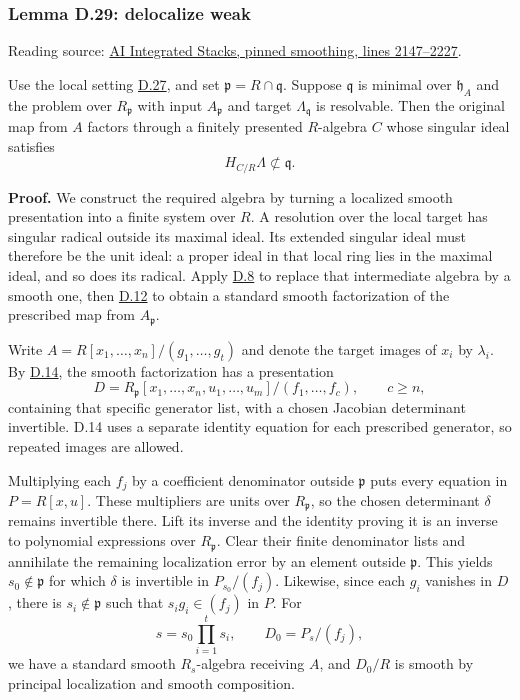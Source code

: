 \documentclass[11pt,a4paper,openany]{report}
\begin{document}
\label{AG-RG-S05-smoothing-lemma-delocalize-weak}

\subsubsection{Lemma D.29: delocalize weak}\label{AG-RG-S05-lemma-d.29-delocalize-weak}

Reading source: \href{https://github.com/KokunoYumeto/unofficial-stacks-project-ai-drafts/blob/565b10e987aba5969b21145a0833f42d69f96790/smoothing.tex\#L2147-L2227}{AI Integrated Stacks, pinned smoothing, lines 2147--2227}.

Use the local setting \hyperref[AG-RG-S05-smoothing-situation-local]{D.27}, and set \(\mathfrak p=R\cap\mathfrak q\). Suppose \(\mathfrak q\) is minimal over \(\mathfrak h_A\) and the problem over \(R_{\mathfrak p}\) with input \(A_{\mathfrak p}\) and target \(\Lambda_{\mathfrak q}\) is resolvable. Then the original map from \(A\) factors through a finitely presented \(R\)-algebra \(C\) whose singular ideal satisfies \[H_{C/R}\Lambda\not\subset\mathfrak q.\]

\textbf{Proof.} We construct the required algebra by turning a localized smooth presentation into a finite system over \(R\). A resolution over the local target has singular radical outside its maximal ideal. Its extended singular ideal must therefore be the unit ideal: a proper ideal in that local ring lies in the maximal ideal, and so does its radical. Apply \hyperref[AG-RG-S05-smoothing-lemma-final-solve]{D.8} to replace that intermediate algebra by a smooth one, then \hyperref[AG-RG-S05-smoothing-lemma-smooth-standard-smooth]{D.12} to obtain a standard smooth factorization of the prescribed map from \(A_{\mathfrak p}\).

Write \(A=R[x_1,\ldots,x_n]/(g_1,\ldots,g_t)\) and denote the target images of \(x_i\) by \(\lambda_i\). By \hyperref[AG-RG-S05-smoothing-lemma-standard-smooth-include-generators]{D.14}, the smooth factorization has a presentation \[D=R_{\mathfrak p}[x_1,\ldots,x_n,u_1,\ldots,u_m]/(f_1,\ldots,f_c),\qquad c\geq n,\] containing that specific generator list, with a chosen Jacobian determinant invertible. D.14 uses a separate identity equation for each prescribed generator, so repeated images are allowed.

Multiplying each \(f_j\) by a coefficient denominator outside \(\mathfrak p\) puts every equation in \(P=R[x,u]\). These multipliers are units over \(R_{\mathfrak p}\), so the chosen determinant \(\delta\) remains invertible there. Lift its inverse and the identity proving it is an inverse to polynomial expressions over \(R_{\mathfrak p}\). Clear their finite denominator lists and annihilate the remaining localization error by an element outside \(\mathfrak p\). This yields \(s_0\notin\mathfrak p\) for which \(\delta\) is invertible in \(P_{s_0}/(f_j)\). Likewise, since each \(g_i\) vanishes in \(D\), there is \(s_i\notin\mathfrak p\) such that \(s_i g_i\in(f_j)\) in \(P\). For \[s=s_0\prod_{i=1}^t s_i,\qquad D_0=P_s/(f_j),\] we have a standard smooth \(R_s\)-algebra receiving \(A\), and \(D_0/R\) is smooth by principal localization and smooth composition.
\end{document}
